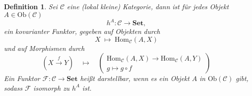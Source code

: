 \documentclass[a4paper, 11pt]{scrartcl}
\newcommand{\Hom}{\text{Hom}}
\newcommand{\Ob}{\text{Ob}}
\theoremstyle{basicstyle}
\newtheorem{definition}{Definition}[section]
\newtheorem{bemerkung}[definition]{Bemerkung}
\begin{document}

    \begin{definition}
        Sei \(\mathcal{C}\) eine (lokal kleine) Kategorie, dann ist für jedes Objekt \(A \in \Ob(\mathcal{C})\)
        \[h^A: \mathcal{C} \longrightarrow \textbf{Set},\]
        ein kovarianter Funktor, gegeben auf Objekten durch
        \[X \;\mapsto\; \Hom_{\mathcal{C}}(A, X)\]
        und auf Morphismen durch
        \[\left(X \overset{f}{\longrightarrow} Y\right) \quad\mapsto\quad \begin{pmatrix} \Hom_{\mathcal{C}}(A, X) \longrightarrow \Hom_{\mathcal{C}}(A, Y) \\ g \mapsto g \circ f \end{pmatrix}\]
        Ein Funktor \(\mathcal{F}: \mathcal{C} \to \textbf{Set}\) heißt \emph{darstellbar}, wenn es ein Objekt \(A\) in \(\Ob(\mathcal{C})\) gibt, sodass \(\mathcal{F}\) isomorph zu \(h^A\) ist. %
    \end{definition}
\end{document}
